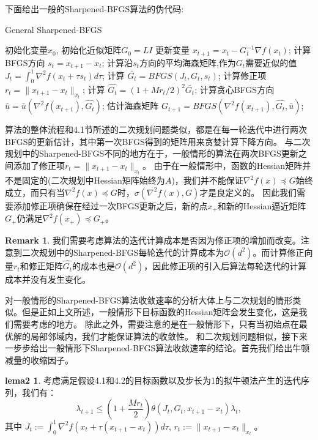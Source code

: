 \documentclass[a4paper,twoside,AutoFakeBold]{article}
\theoremstyle{definition}
\newtheorem{lema2}{{lema2}}
\newtheorem{remark2}{{Remark}}
\begin{document}
下面给出一般的Sharpened-BFGS算法的伪代码:
\begin{algorithm}[H]\xiaosi
    \caption{\xiaosi General Sharpened-BFGS}
    \begin{algorithmic}{
        \REQUIRE 初始化变量$x_0$, 初始化近似矩阵$G_0=LI$
            \STATE 更新变量 $x_{t+1}=x_t-G_t^{-1}\nabla f(x_t)$;
            \STATE 计算BFGS方向 $s_t=x_{t+1}-x_t$;
            \STATE 计算沿$s_t$方向的平均海森矩阵,作为$G_t$需要近似的值 $J_t=\int_0^1\nabla^2f(x_t+\tau s_t)d\tau$;
            \STATE 计算 $\bar{G_t}=BFGS(J_t,G_t,s_t)$;
            \STATE 计算修正项 $r_t = \|x_{t + 1} - x_{t}\|_{x_t}$;
            \STATE 计算 $\hat{G_t} = (1 + {Mr_t}/{2})^2\bar{G_t}$;
            \STATE 计算贪心BFGS方向$\bar{u} = \bar{u}(\nabla^2{f(x_{t + 1})}, \hat{G_t})$;
            \STATE 估计海森矩阵 $G_{t + 1} = BFGS(\nabla^2{f(x_{t + 1})}, \hat{G_t}, \bar{u})$;
        \ENDFOR}
    \end{algorithmic}
\end{algorithm}
算法的整体流程和4.1节所述的二次规划问题类似，都是在每一轮迭代中进行两次BFGS的更新估计，其中第一次BFGS得到的矩阵用来贪婪计算下降方向。
与二次规划中的Sharpened-BFGS不同的地方在于，一般情形的算法在两次BFGS更新之间添加了修正项$r_t=\|x_{t + 1} - x_{t}\|_{x_t}$。
由于在一般情形中，函数的Hessian矩阵并不是固定的(二次规划中Hessian矩阵始终为$A$)，我们并不能保证$\nabla^2 f(x)\preceq G$始终成立，而只有当$\nabla^2 f(x)\preceq G$时，$\sigma (\nabla^2 f(x),G)$才是良定义的。
因此我们需要添加修正项确保在经过一次BFGS更新之后，新的点$x_{+}$和新的Hessian逼近矩阵$G_{+}$仍满足$\nabla^2 f(x_{+})\preceq G_{+}$。
\begin{remark2}
    我们需要考虑算法的迭代计算成本是否因为修正项的增加而改变。注意到二次规划中的Sharpened-BFGS每轮迭代的计算成本为$\mathcal{O}(d^2)$。而计算修正向量$r_t$和修正矩阵$\hat{G_t}$的成本也是$\mathcal{O}(d^2)$，因此修正项的引入后算法每轮迭代的计算成本并没有发生变化。
\end{remark2}

对一般情形的Sharpened-BFGS算法收敛速率的分析大体上与二次规划的情形类似。但是正如上文所述，一般情形下目标函数的Hessian矩阵会发生变化，这是我们需要考虑的地方。
除此之外，需要注意的是在一般情形下，只有当初始点在最优解的局部邻域内，我们才能保证算法的收敛性。
和二次规划问题相似，接下来一步步给出一般情形下Sharpened-BFGS算法收敛速率的结论。首先我们给出牛顿减量的收缩因子。

\begin{lema2}
    考虑满足假设4.1和4.2的目标函数以及步长为1的拟牛顿法产生的迭代序列，我们有：
    \begin{equation}
        \lambda_{t+1} \leq \left(1 + \frac{Mr_t}{2}\right)\theta(J_t, G_t, x_{t + 1} - x_{t})\lambda_t,
    \end{equation}
    其中 $J_t := \int_{0}^{1}\nabla^2{f(x_t + \tau(x_{t + 1} - x_{t}))d\tau}$, $r_t := \|x_{t+1} - x_t\|_{x_t}$。
\end{lema2}
\end{document}
